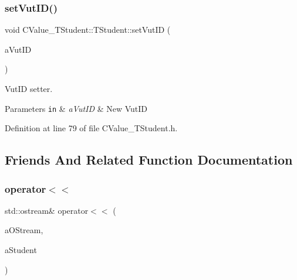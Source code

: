 \mbox{\label{class_c_value___t_student_1_1_t_student_a915ea3d513d4e807e4ac4bb3df62beeb}} 
\subsubsection{\texorpdfstring{set\+Vut\+I\+D()}{setVutID()}}
{\footnotesize\ttfamily void C\+Value\+\_\+\+T\+Student\+::\+T\+Student\+::set\+Vut\+ID (\begin{DoxyParamCaption}\item[{int}]{a\+Vut\+ID }\end{DoxyParamCaption})\hspace{0.3cm}{\ttfamily [inline]}}



Vut\+ID setter. 


\begin{DoxyParams}[1]{Parameters}
\mbox{\tt in}  & {\em a\+Vut\+ID} & New Vut\+ID \\
\hline
\end{DoxyParams}


Definition at line 79 of file C\+Value\+\_\+\+T\+Student.\+h.



\subsection{Friends And Related Function Documentation}
\mbox{\label{class_c_value___t_student_1_1_t_student_a434b280a875b2f3beb85d6969829df6a}} 
\subsubsection{\texorpdfstring{operator$<$$<$}{operator<<}}
{\footnotesize\ttfamily std\+::ostream\& operator$<$$<$ (\begin{DoxyParamCaption}\item[{std\+::ostream \&}]{a\+O\+Stream,  }\item[{const \hyperlink{class_c_value___t_student_1_1_t_student}{T\+Student} \&}]{a\+Student }\end{DoxyParamCaption})\hspace{0.3cm}{\ttfamily [friend]}}



